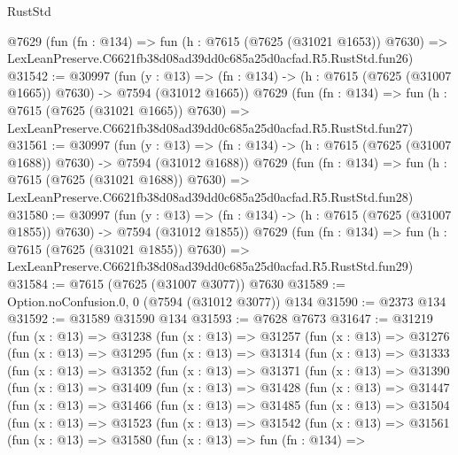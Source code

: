 \begin{lexlean}{RustStd}
\begin{coremodule}
    @7629
    (fun (fn : @134) =>
    fun (h : @7615 (@7625 (@31021 @1653)) @7630) =>
    LexLeanPreserve.C6621fb38d08ad39dd0c685a25d0acfad.R5.RustStd.fun26)
@31542 := @30997
    (fun (y : @13) =>
    (fn : @134) -> (h : @7615 (@7625 (@31007 @1665)) @7630) -> @7594 (@31012 @1665))
    @7629
    (fun (fn : @134) =>
    fun (h : @7615 (@7625 (@31021 @1665)) @7630) =>
    LexLeanPreserve.C6621fb38d08ad39dd0c685a25d0acfad.R5.RustStd.fun27)
@31561 := @30997
    (fun (y : @13) =>
    (fn : @134) -> (h : @7615 (@7625 (@31007 @1688)) @7630) -> @7594 (@31012 @1688))
    @7629
    (fun (fn : @134) =>
    fun (h : @7615 (@7625 (@31021 @1688)) @7630) =>
    LexLeanPreserve.C6621fb38d08ad39dd0c685a25d0acfad.R5.RustStd.fun28)
@31580 := @30997
    (fun (y : @13) =>
    (fn : @134) -> (h : @7615 (@7625 (@31007 @1855)) @7630) -> @7594 (@31012 @1855))
    @7629
    (fun (fn : @134) =>
    fun (h : @7615 (@7625 (@31021 @1855)) @7630) =>
    LexLeanPreserve.C6621fb38d08ad39dd0c685a25d0acfad.R5.RustStd.fun29)
@31584 := @7615 (@7625 (@31007 @3077)) @7630
@31589 := Option.noConfusion.{0, 0} (@7594 (@31012 @3077)) @134
@31590 := @2373 @134
@31592 := @31589 @31590 @134
@31593 := @7628 @7673
@31647 := @31219
    (fun (x : @13) =>
    @31238
      (fun (x : @13) =>
      @31257
        (fun (x : @13) =>
        @31276
          (fun (x : @13) =>
          @31295
            (fun (x : @13) =>
            @31314
              (fun (x : @13) =>
              @31333
                (fun (x : @13) =>
                @31352
                  (fun (x : @13) =>
                  @31371
                    (fun (x : @13) =>
                    @31390
                      (fun (x : @13) =>
                      @31409
                        (fun (x : @13) =>
                        @31428
                          (fun (x : @13) =>
                          @31447
                            (fun (x : @13) =>
                            @31466
                              (fun (x : @13) =>
                              @31485
                                (fun (x : @13) =>
                                @31504
                                  (fun (x : @13) =>
                                  @31523
                                    (fun (x : @13) =>
                                    @31542
                                      (fun (x : @13) =>
                                      @31561
                                        (fun (x : @13) =>
                                        @31580
                                          (fun (x : @13) =>
                                          fun (fn : @134) =>

\end{coremodule}
\end{lexlean}
